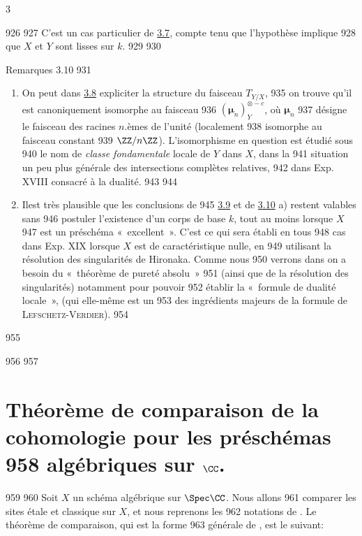 3	\documentclass[10pt]{../fichiers-configuration-latex/smfart}
\begin{document}
   926	
   927	C'est un cas particulier de \hyperref[XVI.thm3.7]{3.7}, compte tenu que l'hypothèse implique
   928	que $X$ et $Y$ sont lisses sur $k$.
   929	
   930	\begin{enonce*}[remark]{Remarques 3.10}
   931	\begin{enumerate}
   932	\renewcommand{\theenumi}{\alph{enumi}}
   933	\renewcommand{\labelenumi}{\theenumi)}
   934	\item On peut dans \hyperref[XVI.cor3.8]{3.8} expliciter la structure du faisceau $T_{Y/X}$,
   935	on trouve qu'il est canoniquement isomorphe au faisceau
   936	$(𝛍_n)_Y^{\otimes -c}$, où $𝛍_n$
   937	désigne le faisceau des racines $n$.èmes de l'unité (localement
   938	isomorphe au faisceau constant
   939	$\ZZ/n\ZZ$). L'isomorphisme en question est étudié sous
   940	le nom de \emph{classe fondamentale} locale de $Y$ dans $X$, dans la
   941	situation un peu plus générale des intersections complètes relatives,
   942	dans Exp. XVIII consacré à la dualité.
   943	
   944	\item Il\pageoriginale est très plausible que les conclusions de
   945	\hyperref[XVI.cor3.9]{3.9} et de \hyperref[XVI.rems3.10]{3.10} a) restent valables sans
   946	postuler l'existence d'un corps de base $k$, tout au moins lorsque $X$
   947	est un préschéma « excellent ». C'est ce qui sera établi en tous
   948	cas dans Exp. XIX lorsque $X$ est de caractéristique nulle, en
   949	utilisant la résolution des singularités de Hironaka. Comme nous
   950	verrons dans  on a besoin du « théorème de pureté absolu »
   951	(ainsi que de la résolution des singularités) notamment pour pouvoir
   952	établir la « formule de dualité locale », (qui elle-même est un
   953	des ingrédients majeurs de la formule de \textsc{Lefschetz-Verdier}).
   954	\end{enumerate}
   955	\end{enonce*}
   956	
   957	\section{Théorème de comparaison de la cohomologie pour les préschémas
   958	algébriques sur $\CC$.}
   959	
   960	Soit $X$ un schéma algébrique sur $\Spec \CC$. Nous allons
   961	comparer les sites étale et classique sur $X$, et nous reprenons les
   962	notations de . Le théorème de comparaison, qui est la forme
   963	générale de , est le suivant:
\end{document}
